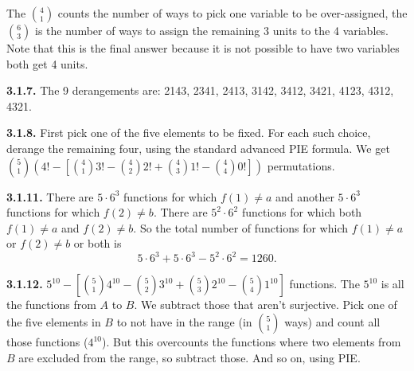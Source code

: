 \documentclass[10pt,]{book}
\theoremstyle{plain}
\theoremstyle{definition}
\theoremstyle{definition}
\theoremstyle{definition}
\theoremstyle{definition}
\numberwithin{equation}{chapter}
\begin{document}
%
\par
\hypertarget{p-932}{}%
The \({4 \choose 1}\) counts the number of ways to pick one variable to be over-assigned, the \({6 \choose 3}\) is the number of ways to assign the remaining 3 units to the 4 variables.  Note that this is the final answer because it is not possible to have two variables both get 4 units.%
\par\smallskip
\noindent\textbf{3.1.7.} \hypertarget{p-936}{}%
The 9 derangements are: 2143, 2341, 2413, 3142, 3412, 3421, 4123, 4312, 4321.%
\par\smallskip
\noindent\textbf{3.1.8.} \hypertarget{p-938}{}%
First pick one of the five elements to be fixed.  For each such choice, derange the remaining four, using the standard advanced PIE formula.  We get \({5 \choose 1}\left( 4! - \left[{4 \choose 1}3! - {4 \choose 2}2! + {4 \choose 3} 1! - {4 \choose 4} 0!\right] \right)\) permutations.%
\par\smallskip
\noindent\textbf{3.1.11.} \hypertarget{p-945}{}%
There are \(5 \cdot 6^3\) functions for which \(f(1) \ne a\) and another \(5 \cdot 6^3\) functions for which \(f(2) \ne b\).  There are \(5^2 \cdot 6^2\) functions for which both \(f(1) \ne a\) and \(f(2) \ne b\).  So the total number of functions for which \(f(1) \ne a\) or \(f(2) \ne b\) or both is%
\begin{equation*}
5 \cdot 6^3 + 5 \cdot 6^3 - 5^2 \cdot 6^2 = 1260.
\end{equation*}
%
\par\smallskip
\noindent\textbf{3.1.12.} \hypertarget{p-947}{}%
\(5^{10} - \left[{5 \choose 1}4^{10} - {5 \choose 2}3^{10} + {5 \choose 3}2^{10} - {5 \choose 4}1^{10}\right]\) functions.  The \(5^{10}\) is all the functions from \(A\) to \(B\).  We subtract those that aren't surjective.  Pick one of the five elements in \(B\) to not have in the range (in \({5 \choose 1}\) ways) and count all those functions (\(4^{10}\)).  But this overcounts the functions where two elements from \(B\) are excluded from the range, so subtract those.  And so on, using PIE.%
\par\smallskip
\end{document}
